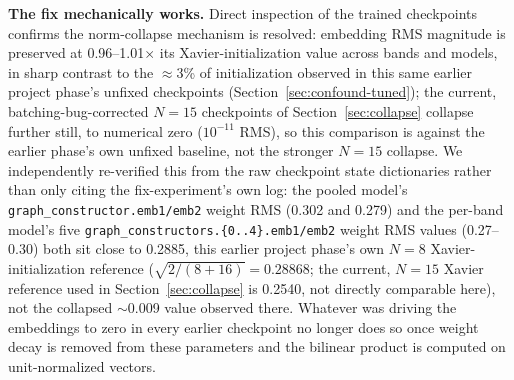 \documentclass[journal]{IEEEtran}
\begin{document}
\textbf{The fix mechanically works.} Direct inspection of the trained checkpoints confirms the norm-collapse mechanism is resolved: embedding RMS magnitude is preserved at 0.96--1.01$\times$ its Xavier-initialization value across bands and models, in sharp contrast to the $\approx$3\% of initialization observed in this same earlier project phase's unfixed checkpoints (Section~\ref{sec:confound-tuned}); the current, batching-bug-corrected $N=15$ checkpoints of Section~\ref{sec:collapse} collapse further still, to numerical zero ($10^{-11}$ RMS), so this comparison is against the earlier phase's own unfixed baseline, not the stronger $N=15$ collapse. We independently re-verified this from the raw checkpoint state dictionaries rather than only citing the fix-experiment's own log: the pooled model's \texttt{graph\_constructor.emb1/emb2} weight RMS (0.302 and 0.279) and the per-band model's five \texttt{graph\_constructors.\{0..4\}.emb1/emb2} weight RMS values (0.27--0.30) both sit close to 0.2885, this earlier project phase's own $N=8$ Xavier-initialization reference ($\sqrt{2/(8+16)}=0.28868$; the current, $N=15$ Xavier reference used in Section~\ref{sec:collapse} is 0.2540, not directly comparable here), not the collapsed $\sim$0.009 value observed there. Whatever was driving the embeddings to zero in every earlier checkpoint no longer does so once weight decay is removed from these parameters and the bilinear product is computed on unit-normalized vectors.
\end{document}
